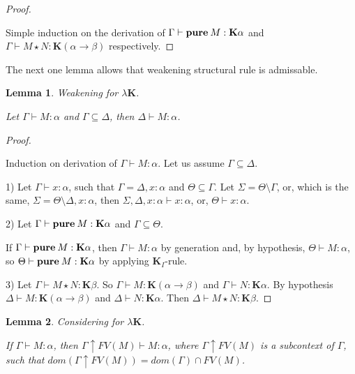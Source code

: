\documentclass[a4paper]{article}
\newtheorem{lemma}{Lemma}
\begin{document}
  \begin{proof}

  $ $

  Simple induction on the derivation of $\Gamma \vdash {\bf pure \: } M : \textbf{K}\alpha$ and $\Gamma \vdash M \star N : \textbf{K}(\alpha \to \beta)$ respectively.
  \end{proof}

  \vspace{\baselineskip}

  The next one lemma allows that weakening structural rule is admissable.

  \begin{lemma} Weakening for $\lambda \textbf{K}$.

  Let $\Gamma \vdash M : \alpha$ and $\Gamma \subseteq \Delta$, then $\Delta \vdash M : \alpha$.

  \end{lemma}

  \begin{proof}

  $ $

  Induction on derivation of $\Gamma \vdash M : \alpha$. Let us assume $\Gamma \subseteq \Delta$.

  1) Let $\Gamma \vdash x : \alpha$, such that $\Gamma = \Delta, x : \alpha$ and $\Theta \subseteq \Gamma$.
  Let $\Sigma = \Theta \setminus \Gamma$, or, which is the same, $\Sigma = \Theta \setminus \Delta, x :
  \alpha$, then $\Sigma,
  \Delta, x : \alpha \vdash x : \alpha$, or, $\Theta \vdash x : \alpha$.

  2) Let $\Gamma \vdash {\bf pure \: } M : \textbf{K}\alpha$ and $\Gamma \subseteq \Theta$.

  If $\Gamma \vdash {\bf pure \: } M : \textbf{K}\alpha$, then $\Gamma \vdash M : \alpha$ by generation and, by
  hypothesis, $\Theta \vdash M : \alpha$, so $\Theta \vdash {\bf pure \: } M : \textbf{K}\alpha$ by applying
  $\textbf{K}_I$-rule.

  3) Let $\Gamma \vdash M \star N : \textbf{K}\beta$. So $\Gamma \vdash M : \textbf{K}(\alpha \to \beta)$ and $\Gamma
  \vdash N : \textbf{K}\alpha$. By hypothesis $\Delta \vdash M : \textbf{K}(\alpha \to \beta)$ and $\Delta \vdash N :
  \textbf{K}\alpha$. Then $\Delta \vdash M \star N : \textbf{K}\beta$.

  \end{proof}

  \begin{lemma} Considering for $\lambda \textbf{K}$.

  If $\Gamma \vdash M : \alpha$, then $\Gamma \uparrow FV(M) \vdash M : \alpha$, where $\Gamma \uparrow
  FV(M)$ is a subcontext of $\Gamma$, such that $dom(\Gamma \uparrow FV(M)) = dom(\Gamma) \cap FV(M)$.

  \end{lemma}
\end{document}
